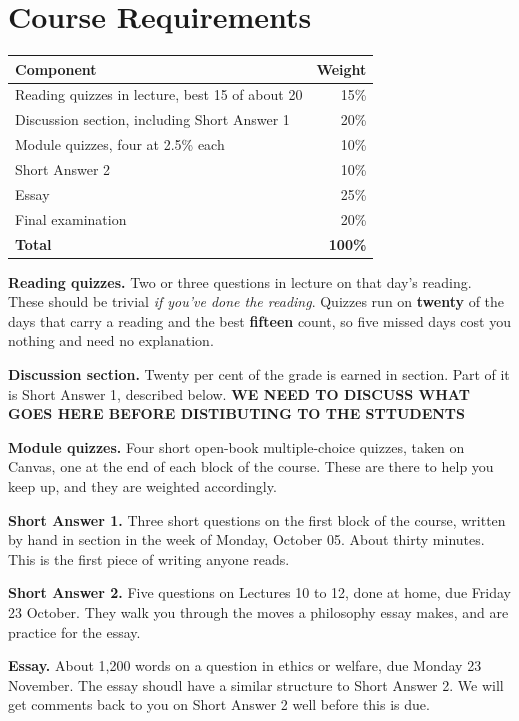 \documentclass[
  letterpaper,
  DIV=11,
  numbers=noendperiod]{scrartcl}
\newcounter{none} %
\begin{document}
\section{Course Requirements}\label{course-requirements}

{\def\LTcaptype{none} %
\begin{longtable}[]{@{}lr@{}}
\toprule\noalign{}
Component & Weight \\
\midrule\noalign{}
\endhead
\bottomrule\noalign{}
\endlastfoot
Reading quizzes in lecture, best 15 of about 20 & 15\% \\
Discussion section, including Short Answer 1 & 20\% \\
Module quizzes, four at 2.5\% each & 10\% \\
Short Answer 2 & 10\% \\
Essay & 25\% \\
Final examination & 20\% \\
\textbf{Total} & \textbf{100\%} \\
\end{longtable}
}

\textbf{Reading quizzes.} Two or three questions in lecture on that
day's reading. These should be trivial \emph{if you've done the
reading}. Quizzes run on \textbf{twenty} of the days that carry a
reading and the best \textbf{fifteen} count, so five missed days cost
you nothing and need no explanation.

\textbf{Discussion section.} Twenty per cent of the grade is earned in
section. Part of it is Short Answer 1, described below. \textbf{WE NEED
TO DISCUSS WHAT GOES HERE BEFORE DISTIBUTING TO THE STTUDENTS}

\textbf{Module quizzes.} Four short open-book multiple-choice quizzes,
taken on Canvas, one at the end of each block of the course. These are
there to help you keep up, and they are weighted accordingly.

\textbf{Short Answer 1.} Three short questions on the first block of the
course, written by hand in section in the week of Monday, October 05.
About thirty minutes. This is the first piece of writing anyone reads.

\textbf{Short Answer 2.} Five questions on Lectures 10 to 12, done at
home, due Friday 23 October. They walk you through the moves a
philosophy essay makes, and are practice for the essay.

\textbf{Essay.} About 1,200 words on a question in ethics or welfare,
due Monday 23 November. The essay shoudl have a similar structure to
Short Answer 2. We will get comments back to you on Short Answer 2 well
before this is due.
\end{document}
